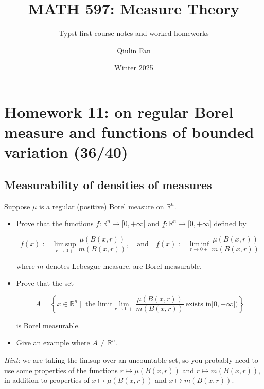 \documentclass{qlnotes-export}
\title{MATH 597: Measure Theory}
\subtitle{Typst-first course notes and worked homeworks}
\author{Qiulin Fan}
\date{Winter 2025}
\begin{document}
\mainmatter
\chapter{Homework 11: on regular Borel measure and functions of bounded variation (36/40)}\label{homework-11-on-regular-borel-measure-and-functions-of-bounded-variation-3640}

\section{Measurability of densities of measures}\label{measurability-of-densities-of-measures}

Suppose \(\mu\) is a regular (positive) Borel measure on \({\mathbb{R}}^{n}\).

\begin{itemize}
\item
  Prove that the functions \(\bar{f}:{\mathbb{R}}^{n}\rightarrow\lbrack 0, + \infty\rbrack\) and \(\underset{¯}{f}:{\mathbb{R}}^{n}\rightarrow\lbrack 0, + \infty\rbrack\) defined by

  \[\bar{f}(x) := \operatorname{lim\, sup}\limits_{r\rightarrow 0 +}\frac{\mu(B(x,r))}{m(B(x,r))},\quad\text{and}\quad\underset{¯}{f}(x) := \operatorname{lim\, inf}\limits_{r\rightarrow 0 +}\frac{\mu(B(x,r))}{m(B(x,r))}\]

  where \(m\) denotes Lebesgue measure, are Borel measurable.
\item
  Prove that the set

  \[A = \left\{ {x \in {\mathbb{R}}^{n} \mid \ \text{the limit}\lim\limits_{r\rightarrow 0 +}\frac{\mu(B(x,r))}{m(B(x,r))}\ \text{exists in}\lbrack 0, + \infty\rbrack\text{)}} \right\}\]

  is Borel measurable.
\item
  Give an example where \(A \neq {\mathbb{R}}^{n}\).
\end{itemize}

\emph{Hint}: we are taking the limsup over an uncountable set, so you probably need to use some properties of the functions \(r\mapsto\mu(B(x,r))\) and \(r\mapsto m(B(x,r))\), in addition to properties of \(x\mapsto\mu(B(x,r))\) and \(x\mapsto m(B(x,r))\).
\end{document}
